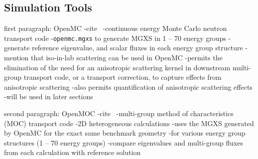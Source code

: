 \subsection{Simulation Tools}
\label{subsubsec:sim-tools-case2}

first paragraph: OpenMC
-cite~\cite{romano2013openmc}
-continuous energy Monte Carlo neutron transport code
-\texttt{openmc.mgxs} to generate MGXS in 1 -- 70 energy groups
-generate reference eigenvalue, and scalar fluxes in each energy group structure
-mention that iso-in-lab scattering can be used in OpenMC
  -permits the elimination of the need for an anisotropic scattering kernel in downstream multi-group transport code, or a transport correction, to capture effects from anisotropic scattering
  -also permits quantification of anisotropic scattering effects
  -will be used in later sections

second paragraph: OpenMOC
-cite~\cite{boyd2014openmoc}
-multi-group method of characteristics (MOC) transport code
-2D heterogeneous calculations
-uses the MGXS generated by OpenMC for the exact same benchmark geometry
  -for various energy group structures (1 -- 70 energy groups)
-compare eigenvalues and multi-group fluxes from each calculation with reference solution